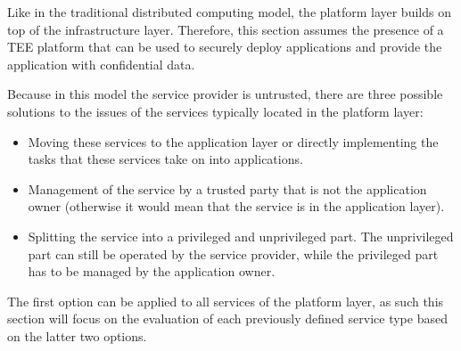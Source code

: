 Like in the traditional distributed computing model, the platform layer builds
on top of the infrastructure layer. Therefore, this section assumes the presence
of a TEE platform that can be used to securely deploy applications and provide
the application with confidential data.

Because in this model the service provider is untrusted, there are three
possible solutions to the issues of the services typically located in the
platform layer:

\begin{itemize}
  \item Moving these services to the application layer or directly implementing
        the tasks that these services take on into applications.
  \item Management of the service by a trusted party that is not the application
        owner (otherwise it would mean that the service is in the application
        layer).
  \item Splitting the service into a privileged and unprivileged part. The
        unprivileged part can still be operated by the service provider, while
        the privileged part has to be managed by the application owner.
\end{itemize}

The first option can be applied to all services of the platform layer, as such
this section will focus on the evaluation of each previously defined service
type based on the latter two options.

